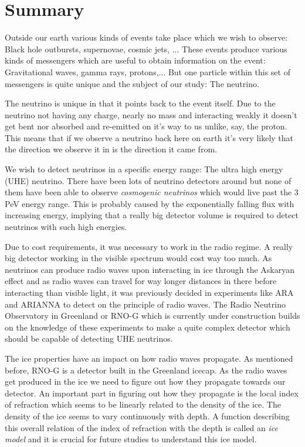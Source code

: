 \shipout\null
\newpage
\chapter*{Summary}
Outside our earth various kinds of events take place which we wish to 
observe: Black hole outbursts, supernovae, cosmic jets, ...
These events produce various kinds of messengers which are useful to obtain
information on the event: Gravitational waves, gamma rays, protons,...
But one particle within this set of messengers is quite unique and
the subject of our study: The neutrino. 

The neutrino is unique in that it points back to the event itself.
Due to the neutrino not having any charge, nearly no mass and 
interacting weakly it doesn't get bent nor absorbed and re-emitted 
on it's way to us unlike, say, the proton. This means that if we observe
a neutrino back here on earth it's very likely that the direction we observe
it in is the direction it came from.

We wish to detect neutrinos in a specific energy range: The ultra high energy (UHE)
neutrino.  There have been lots of neutrino detectors around but none of them
have been able to observe \textit{cosmogenic neutrinos} which would live past
the 3 PeV energy range. This is probably caused by the exponentially falling
flux with increasing energy, implying that a really big detector volume is
required to detect neutrinos with such high energies. 

Due to cost requirements, it was necessary to work in the radio regime.  A
really big detector working in the visible spectrum would cost way too much. As
neutrinos can produce radio waves upon interacting in ice through the Askaryan
effect and as radio waves can travel for way longer distances in there before
interacting than visible light, it was previously decided in experiments like
ARA and ARIANNA to detect on the principle of radio waves. The Radio Neutrino
Observatory in Greenland or RNO-G which is currently under construction builds
on the knowledge of these experiments to make a quite complex detector which
should be capable of detecting UHE neutrinos.

The ice properties have an impact on how radio waves propagate. As mentioned before, RNO-G is a detector built
in the Greenland icecap. As the radio waves get produced in the ice we need to figure out how
they propagate towards our detector. An important part in figuring out how they propagate is 
the local index of refraction which seems to be linearly related to the density of the ice. 
The density of the ice seems to vary continuously with depth. A function describing
this overall relation of the index of refraction with the depth is called an \textit{ice model}
and it is crucial for future studies to understand this ice model.

